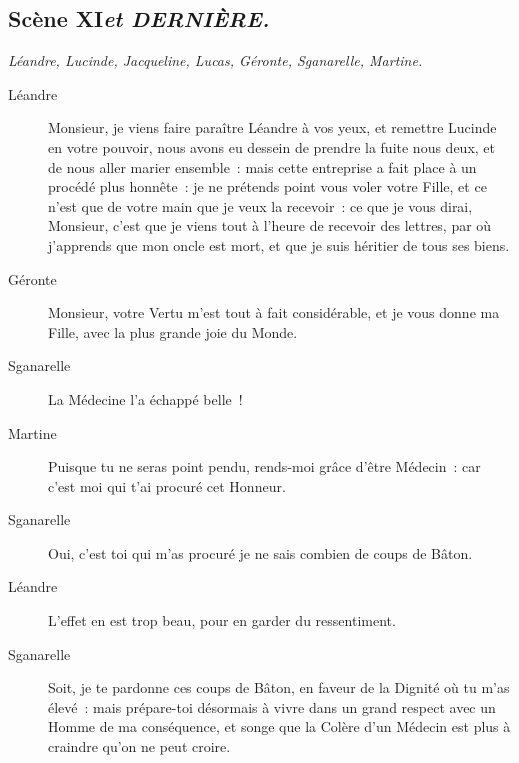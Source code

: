 \documentclass[french,twoside]{book} %
\begin{document}
\subsection[{Scène XI et DERNIÈRE.}]{Scène XI{\itshape  et DERNIÈRE.}}
\label{III11}
\textit{Léandre, Lucinde, Jacqueline, Lucas, Géronte, Sganarelle, Martine.}\par
 \begin{description} \item[Léandre] 

Monsieur, je viens faire paraître Léandre à vos yeux, et remettre Lucinde en votre pouvoir, nous avons eu dessein de prendre la fuite nous deux, et de nous aller marier ensemble : mais cette entreprise a fait place à un procédé plus honnête : je ne prétends point vous voler votre Fille, et ce n’est que de votre main que je veux la recevoir : ce que je vous dirai, Monsieur, c’est que je viens tout à l’heure de recevoir des lettres, par où j’apprends que mon oncle est mort, et que je suis héritier de tous ses biens.\end{description}
 \begin{description} \item[Géronte] 

Monsieur, votre Vertu m’est tout à fait considérable, et je vous donne ma Fille, avec la plus grande joie du Monde.\end{description}
 \begin{description} \item[Sganarelle] 

La Médecine l’a échappé belle !\end{description}
 \begin{description} \item[Martine] 

Puisque tu ne seras point pendu, rends-moi grâce d’être Médecin : car c’est moi qui t’ai procuré cet Honneur.\end{description}
 \begin{description} \item[Sganarelle] 

Oui, c’est toi qui m’as procuré je ne sais combien de coups de Bâton.\end{description}
 \begin{description} \item[Léandre] 

L’effet en est trop beau, pour en garder du ressentiment.\end{description}
 \begin{description} \item[Sganarelle] 

Soit, je te pardonne ces coups de Bâton, en faveur de la Dignité où tu m’as élevé : mais prépare-toi désormais à vivre dans un grand respect avec un Homme de ma conséquence, et songe que la Colère d’un Médecin est plus à craindre qu’on ne peut croire.\end{description}
 
\end{document}
